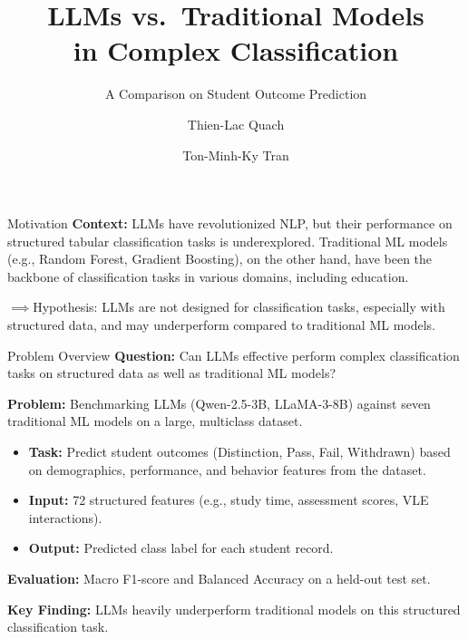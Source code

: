 \documentclass[aspectratio=169]{beamer}
\title{LLMs vs.\ Traditional Models\\in Complex Classification}
\subtitle{A Comparison on Student Outcome Prediction}
\author{Thien-Lac Quach \and Ton-Minh-Ky Tran}
\institute{Faculty of Information Technology, University of Science\\Vietnam National University, Ho Chi Minh City}
\date{}
\begin{document}
\begin{frame}
\titlepage
\end{frame}

\begin{frame}{Motivation}
\textbf{Context:} LLMs have revolutionized NLP, but their performance on structured tabular classification tasks is underexplored. Traditional ML models (e.g., Random Forest, Gradient Boosting), on the other hand, have been the backbone of classification tasks in various domains, including education.

\vspace{0.4cm}

$\implies $Hypothesis: LLMs are not designed for classification tasks, especially with structured data, and may underperform compared to traditional ML models.
\end{frame}

\begin{frame}{Problem Overview}
\textbf{Question:} Can LLMs effective perform complex classification tasks on structured data as well as traditional ML models?

\vspace{0.4cm}

\textbf{Problem:} Benchmarking LLMs (Qwen-2.5-3B, LLaMA-3-8B) against seven traditional ML models on a large, multiclass dataset.
\begin{itemize}
\item \textbf{Task:} Predict student outcomes (Distinction, Pass, Fail, Withdrawn) based on demographics, performance, and behavior features from the dataset.

\item \textbf{Input:} 72 structured features (e.g., study time, assessment scores, VLE interactions).

\item\textbf{Output:} Predicted class label for each student record.
\end{itemize}

\vspace{0.4cm}
\textbf{Evaluation:} Macro F1-score and Balanced Accuracy on a held-out test set.

\textbf{Key Finding:} LLMs heavily underperform traditional models on this structured classification task.
\end{frame}
\end{document}
